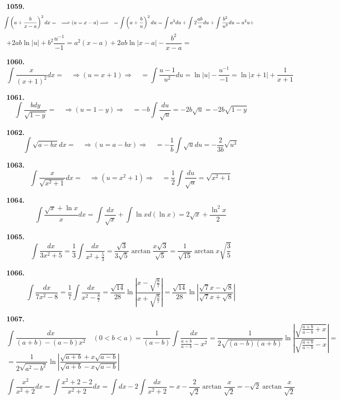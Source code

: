 \documentclass[12pt]{article}
\begin{document}
	{\bf 1059.} \[
	\hspace{-2mm}\int \left(a+\dfrac{b}{x-a}\right)^2dx = \quad \Longrightarrow(u = x-a)  \Longrightarrow\quad = \int \left(a+\dfrac{b}{u}\right)^2du = \int a^2du + \int 2\dfrac{ab}{u}du + \int \dfrac{b^2}{u^2}du = a^2 u +
	\] 
	$
	+2 ab\ln|u|+ b^2\dfrac{u^{-1}}{-1} = a^2(x-a) +2ab\ln|x-a| - \dfrac{b^2}{x-a} = 
	$
	
	\medskip
	{\bf 1060.} \[
		\int\dfrac{x}{(x+1)^2}dx=\quad \Longrightarrow(u = x+1)  \Longrightarrow\quad = \int \dfrac{u-1}{u^2}du = \ln|u| - \dfrac{u^{-1}}{-1} = \ln|x+1| +\dfrac{1}{x+1}
	\]
	
{\bf 1061.}\[
		\int \dfrac{b dy}{\sqrt{1-y}}= \quad \Longrightarrow(u = 1-y)  \Longrightarrow\quad = -b\int\dfrac{du}{\sqrt{u}} = -2b\sqrt{u} = -2b\sqrt{1-y}
	\]
	
	
	{\bf 1062.}\[
		\int\sqrt{a-bx} dx=\quad \Longrightarrow(u = a-bx)  \Longrightarrow\quad = -\dfrac{1}{b}\int\sqrt{u}du = -\dfrac{2}{3b} \sqrt{u^3}
	\]
	
	{\bf 1063.} \[
		\int\dfrac{x}{\sqrt{x^2+1}}dx = \quad \Longrightarrow(u = x^2+1)  \Longrightarrow\quad = \dfrac{1}{2}\int \dfrac{du}{\sqrt{u}} = \sqrt{x^2+1}
	\]
	
	{\bf 1064.}  \[
		\int \dfrac{\sqrt{x}+\ln x}{x}dx  = \int \dfrac{dx}{\sqrt{x}} + \int \ln xd(\ln x) = 2\sqrt{x} + \dfrac{\ln^2 x}{2}
	\]
	
	{\bf 1065.} \[
		\int \dfrac{dx}{3x^2+5} = \dfrac{1}{3}\int\dfrac{dx}{x^2+\frac{5}{3}} = \dfrac{\sqrt{3}}{3\sqrt{5}}\arctan \dfrac{x\sqrt{3}}{\sqrt{5}} = \dfrac{1}{\sqrt{15}}\arctan x\sqrt{\dfrac{3}{5}}
	\]
	
	{\bf 1066.}\[
		\int\dfrac{dx}{7x^2-8} = \dfrac{1}{7} \int \dfrac{dx}{x^2-\frac{8}{7}} = \dfrac{\sqrt{14}}{28}\ln\left|\dfrac{x-\sqrt{\frac{8}{7}}}{x+\sqrt{\frac{8}{7}}}\right| = \dfrac{\sqrt{14}}{28} \ln\left|\dfrac{\sqrt{7}x-\sqrt{8}}{\sqrt{7}x+\sqrt{8}}\right|
	\]
	
	{\bf 1067.} \[
		\int\dfrac{dx}{(a+b)-(a-b)x^2} \quad(0<b<a) = \dfrac{1}{(a-b)}\int\dfrac{dx}{\frac{a+b}{a-b}-x^2} = \dfrac{1}{2\sqrt{(a-b)(a+b)}}\ln\left|\dfrac{\sqrt{\frac{a+b}{a-b}+x}}{\sqrt{\frac{a+b}{a-b}}-x}\right| =
	\]
	$
	 = \dfrac{1}{2\sqrt{a^2-b^2}}\ln\left|\dfrac{\sqrt{a+b}+x\sqrt{a-b}}{\sqrt{a+b} - x\sqrt{a-b}}\right|
	$
	
	 \[
		\int \dfrac{x^2}{x^2+2}dx = \int \dfrac{x^2+2-2}{x^2+2}dx = \int dx - 2\int\dfrac{dx}{x^2+2} = x-\dfrac{2}{\sqrt{2}}\arctan\dfrac{x}{\sqrt{2}} = -\sqrt{2}\arctan\dfrac{x}{\sqrt{2}}
	\]
	
\end{document}
